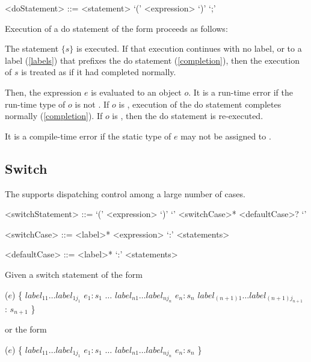\documentclass[makeidx]{article}
\begin{document}
{\begin{grammar}
<doStatement> ::= \DO{} <statement> \WHILE{} `(' <expression> `)' `;'
\end{grammar}

\LMHash{}%
Execution of a do statement of the form  proceeds as follows:

\LMHash{}%
The statement $\{s\}$ is executed.
If that execution continues with no label, or to a label (\ref{labels}) that prefixes the do statement (\ref{completion}), then the execution of $s$ is treated as if it had completed normally.

\LMHash{}%
Then, the expression $e$ is evaluated to an object $o$.
It is a run-time error if the run-time type of $o$ is not .
If $o$ is \FALSE{}, execution of the do statement completes normally (\ref{completion}).
If $o$ is \TRUE{}, then the do statement is re-executed.

\LMHash{}%
It is a compile-time error if the static type of $e$ may not be assigned to .


\subsection{Switch}

\LMHash{}%
The  supports dispatching control among a large number of cases.

\begin{grammar}
<switchStatement> ::= \gnewline{}
  \SWITCH{} `(' <expression> `)' `{' <switchCase>* <defaultCase>? `}'

<switchCase> ::= <label>* \CASE{} <expression> `:' <statements>

<defaultCase> ::= <label>* \DEFAULT{} `:' <statements>
\end{grammar}

\LMHash{}%
 Given a switch statement of the form

\begin{normativeDartCode}
\SWITCH{} ($e$) \{
   $label_{11} \ldots label_{1j_1}$ \CASE{} $e_1: s_1$
   $\ldots$
   $label_{n1} \ldots label_{nj_n}$ \CASE{} $e_n: s_n$
   $label_{(n+1)1} \ldots label_{(n+1)j_{n+1}}$ \DEFAULT{}: $s_{n+1}$
\}
\end{normativeDartCode}

or the form

\begin{normativeDartCode}
\SWITCH{} ($e$) \{
   $label_{11} \ldots label_{1j_1}$ \CASE{} $e_1: s_1$
   $\ldots$
   $label_{n1} \ldots label_{nj_n}$ \CASE{} $e_n: s_n$
\}
\end{normativeDartCode}

}
\end{document}
